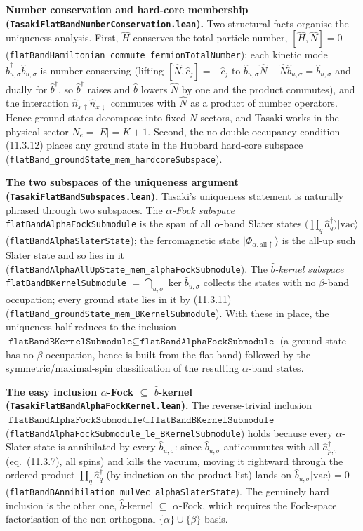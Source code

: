 \documentclass[a4paper,11pt]{article}
\begin{document}
\medskip
\noindent\textbf{Number conservation and hard-core membership
(\texttt{TasakiFlatBandNumberConservation.lean}).}
Two structural facts organise the uniqueness analysis. First, $\hat H$ conserves
the total particle number, $[\hat H, \hat N] = 0$
(\texttt{flatBandHamiltonian\_commute\_fermionTotalNumber}): each kinetic mode
$\hat b^\dagger_{u,\sigma}\hat b_{u,\sigma}$ is number-conserving (lifting
$[\hat N, \hat c_j] = -\hat c_j$ to $\hat b_{u,\sigma}\hat N - \hat N\hat b_{u,
\sigma} = \hat b_{u,\sigma}$ and dually for $\hat b^\dagger$, so $\hat b^\dagger$
raises and $\hat b$ lowers $\hat N$ by one and the product commutes), and the
interaction $\hat n_{x\uparrow}\hat n_{x\downarrow}$ commutes with $\hat N$ as a
product of number operators. Hence ground states decompose into fixed-$N$ sectors,
and Tasaki works in the physical sector $N_e = |E| = K+1$. Second, the
no-double-occupancy condition (11.3.12) places any ground state in the Hubbard
hard-core subspace (\texttt{flatBand\_groundState\_mem\_hardcoreSubspace}).

\medskip
\noindent\textbf{The two subspaces of the uniqueness argument
(\texttt{TasakiFlatBandSubspaces.lean}).}
Tasaki's uniqueness statement is naturally phrased through two subspaces. The
\emph{$\alpha$-Fock subspace} \texttt{flatBandAlphaFockSubmodule} is the span of all
$\alpha$-band Slater states $\bigl(\prod_q \hat a^\dagger_q\bigr)|\mathrm{vac}
\rangle$ (\texttt{flatBandAlphaSlaterState}); the ferromagnetic state
$|\Phi_{\alpha,\mathrm{all}\uparrow}\rangle$ is the all-up such Slater state and so
lies in it (\texttt{flatBandAlphaAllUpState\_mem\_alphaFockSubmodule}). The
\emph{$\hat b$-kernel subspace} \texttt{flatBandBKernelSubmodule}
$= \bigcap_{u,\sigma}\ker \hat b_{u,\sigma}$ collects the states with no
$\beta$-band occupation; every ground state lies in it by (11.3.11)
(\texttt{flatBand\_groundState\_mem\_BKernelSubmodule}). With these in place, the
uniqueness half reduces to the inclusion
$\texttt{flatBandBKernelSubmodule}\subseteq\texttt{flatBandAlphaFockSubmodule}$ (a
ground state has no $\beta$-occupation, hence is built from the flat band) followed
by the symmetric/maximal-spin classification of the resulting $\alpha$-band states.

\medskip
\noindent\textbf{The easy inclusion $\alpha$-Fock $\subseteq$ $\hat b$-kernel
(\texttt{TasakiFlatBandAlphaFockKernel.lean}).}
The reverse-trivial inclusion
$\texttt{flatBandAlphaFockSubmodule}\subseteq\texttt{flatBandBKernelSubmodule}$
(\texttt{flatBandAlphaFockSubmodule\_le\_BKernelSubmodule}) holds because every
$\alpha$-Slater state is annihilated by every $\hat b_{u,\sigma}$: since
$\hat b_{u,\sigma}$ anticommutes with all $\hat a^\dagger_{p,\tau}$ (eq.~(11.3.7),
all spins) and kills the vacuum, moving it rightward through the ordered product
$\prod_q \hat a^\dagger_q$ (by induction on the product list) lands on
$\hat b_{u,\sigma}|\mathrm{vac}\rangle = 0$
(\texttt{flatBandBAnnihilation\_mulVec\_alphaSlaterState}). The genuinely hard
inclusion is the other one, $\hat b$-kernel $\subseteq$ $\alpha$-Fock, which
requires the Fock-space factorisation of the non-orthogonal $\{\alpha\}\cup\{\beta\}$
basis.
\end{document}
